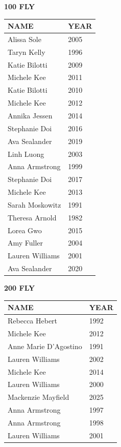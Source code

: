 \begin{table}[H]
\centering
\begin{minipage}[t]{0.48\textwidth}
\centering
\textbf{100 FLY}\\[0.1cm]
\begin{tabular}{@{}p{2.8cm}p{1.2cm}@{}}
\hline
    \textbf{NAME} & \textbf{YEAR} \\
\hline
    Alissa Sole & 2005 \\
    Taryn Kelly & 1996 \\
    Katie Bilotti & 2009 \\
    Michele Kee & 2011 \\
    Katie Bilotti & 2010 \\
    Michele Kee & 2012 \\
    Annika Jessen & 2014 \\
    Stephanie Doi & 2016 \\
    Ava Sealander & 2019 \\
    Linh Luong & 2003 \\
    Anna Armstrong & 1999 \\
    Stephanie Doi & 2017 \\
    Michele Kee & 2013 \\
    Sarah Moskowitz & 1991 \\
    Theresa Arnold & 1982 \\
    Lorea Gwo & 2015 \\
    Amy Fuller & 2004 \\
    Lauren Williams & 2001 \\
    Ava Sealander & 2020 \\
\hline
\end{tabular}
\end{minipage}\hfill
\begin{minipage}[t]{0.48\textwidth}
\centering
\textbf{200 FLY}\\[0.1cm]
\begin{tabular}{@{}p{2.8cm}p{1.2cm}@{}}
\hline
    \textbf{NAME} & \textbf{YEAR} \\
\hline
    Rebecca Hebert & 1992 \\
    Michele Kee & 2012 \\
    Anne Marie D'Agostino & 1991 \\
    Lauren Williams & 2002 \\
    Michele Kee & 2014 \\
    Lauren Williams & 2000 \\
    Mackenzie Mayfield & 2025 \\
    Anna Armstrong & 1997 \\
    Anna Armstrong & 1998 \\
    Lauren Williams & 2001 \\
\hline
\end{tabular}
\end{minipage}
\end{table}

